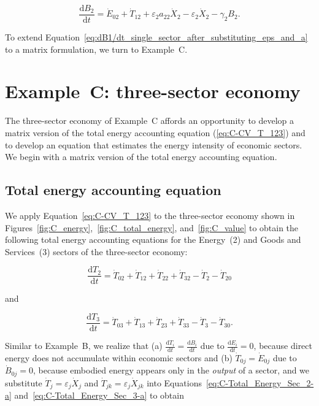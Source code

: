 \begin{equation} \label{eq:dB1/dt_single_sector_after_substituting_eps_and_a}
	\frac{\mathrm{d}B_{2}}{\mathrm{d}t} 
	= \dot{E}_{02} 
	+ \dot{T}_{12}
	+ \varepsilon_{2}a_{22}\dot{X}_{2} 
	- \varepsilon_{2}\dot{X}_{2} 
	- \gamma_{2}B_{2}.
\end{equation}

To extend Equation~\ref{eq:dB1/dt_single_sector_after_substituting_eps_and_a}
to a matrix formulation, we turn to Example~C.


\section{Example~C: three-sector economy} %
\label{sec:C-intensity}

The three-sector economy of Example~C affords an opportunity 
to develop a matrix version 
of the total energy accounting equation (\ref{eq:C-CV_T_123})
and to develop an equation that estimates the
energy intensity of economic sectors. 
We begin with a matrix version of the total energy accounting equation.


\subsection{Total energy accounting equation}

We apply Equation~\ref{eq:C-CV_T_123} to the three-sector
economy shown in 
Figures~\ref{fig:C_energy},~\ref{fig:C_total_energy}, and~\ref{fig:C_value}
to obtain the following total energy accounting equations
for the Energy~(2) and Goods and Services~(3) sectors 
of the three-sector economy:

\begin{equation} \label{eq:C-Total_Energy_Sec_2-a}
	\frac{\mathrm{d}T_{2}}{\mathrm{d}t} 
	= \dot{T}_{02}  
	+ \dot{T}_{12}
	+ \dot{T}_{22}
	+ \dot{T}_{32}
	- \dot{T}_{2}
	- \dot{T}_{20}
\end{equation}

\noindent{}and

\begin{equation} \label{eq:C-Total_Energy_Sec_3-a}
	\frac{\mathrm{d}T_{3}}{\mathrm{d}t} 
	= \dot{T}_{03}  
	+ \dot{T}_{13}
	+ \dot{T}_{23}
	+ \dot{T}_{33}
	- \dot{T}_{3}
	- \dot{T}_{30}.
\end{equation}

\noindent{}Similar to Example~B, we realize that 
(a) $\frac{\mathrm{d}T_i}{\mathrm{d}t} = \frac{\mathrm{d}B_i}{\mathrm{d}t}$ 
due to $\frac{\mathrm{d}E_i}{\mathrm{d}t} = 0$, because direct energy
does not accumulate within economic sectors and
(b) $\dot{T}_{0j} = \dot{E}_{0j}$ due to $\dot{B}_{0j} = 0$, 
because embodied energy appears only in the \emph{output} of a sector, and
we substitute $\dot{T}_{j} = \varepsilon_{j} \dot{X}_{j}$ 
and $\dot{T}_{jk} = \varepsilon_{j} \dot{X}_{jk}$ 
into Equations~\ref{eq:C-Total_Energy_Sec_2-a}
and~\ref{eq:C-Total_Energy_Sec_3-a} to obtain

